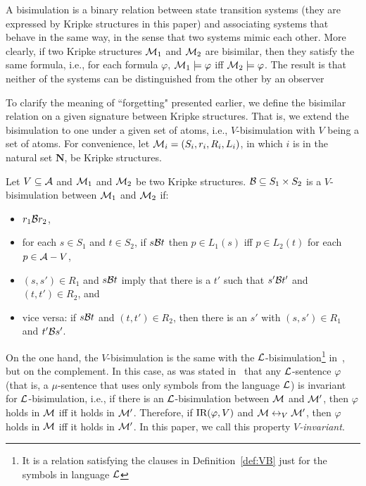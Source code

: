 \documentclass[runningheads]{llncs}
\begin{document}
A bisimulation is a binary relation between state transition systems (they are expressed by Kripke structures in this paper) and associating systems that behave in the same way, in the sense that two systems mimic each other.
More clearly, if two Kripke structures ${\cal M}_1$ and ${\cal M}_2$ are bisimilar, then they satisfy the same formula, i.e., for each formula $\varphi$, ${\cal M}_1 \models \varphi$ iff ${\cal M}_2 \models \varphi$.
The result is that neither of the systems can be distinguished from the other by an observer

To clarify the meaning of ``forgetting" presented earlier,
we define the bisimilar relation on a given signature between Kripke structures.
That is, we extend the bisimulation to one under a given set of atoms, i.e., $V$-bisimulation with $V$ being a set of atoms.
For convenience, let ${\cal M}_i=(S_i, r_i, R_i, L_i)$, in which $i$ is in the natural set $\mathbf{N}$, be Kripke structures.

\begin{definition}[V-bisimulation]\label{def:VB}
	Let $V \subseteq {\cal A}$ and  ${\cal M}_1$ and ${\cal M}_2$ be two Kripke structures. ${\cal B}\subseteq S_1 \times S_2$ is a $V$-bisimulation between ${\cal M}_1$ and ${\cal M}_2$ if:
	\begin{itemize}
		\item $r_1 {\cal B} r_2$,
		\item for each $s\in S_1$ and $t\in S_2$, if $s {\cal B} t$ then $p \in L_1(s)$ iff $p \in L_2(t)$ for each $p \in {\cal A}- V$,
		\item $(s, s')\in R_1$ and $s {\cal B} t$ imply that there is a $t'$ such that $s' {\cal B} t'$ and $(t, t')\in R_2$, and
		\item vice versa: if $s {\cal B} t$ and $(t, t')\in R_2$, then there is an $s'$ with $(s, s')\in R_1$ and $t' {\cal B} s'$.
	\end{itemize}
\end{definition}

On the one hand, the $V$-bisimulation is the same with the ${\cal L}$-bisimulation\footnote{It is a relation satisfying the clauses in Definition~\ref{def:VB} just for the symbols in language ${\cal L}$} in~\cite{d1996uniform}, but on the complement.
In this case, as was stated in~\cite{d1996uniform} that any ${\cal L}$-sentence $\varphi$ (that is, a $\mu$-sentence
that uses only symbols from the language ${\cal L}$) is invariant for ${\cal L}$-bisimulation,  i.e., if there is an ${\cal L}$-bisimulation between ${\cal M}$ and ${\cal M}'$, then $\varphi$ holds in ${\cal M}$ iff it holds in ${\cal M}'$.
Therefore, if $\textrm{IR}(\varphi, V)$ and
${\cal M} \leftrightarrow_V {\cal M}'$, then $\varphi$ holds in ${\cal M}$ iff it holds in ${\cal M}'$.
In this paper, we call this property \emph{$V$-invariant}.
\end{document}

